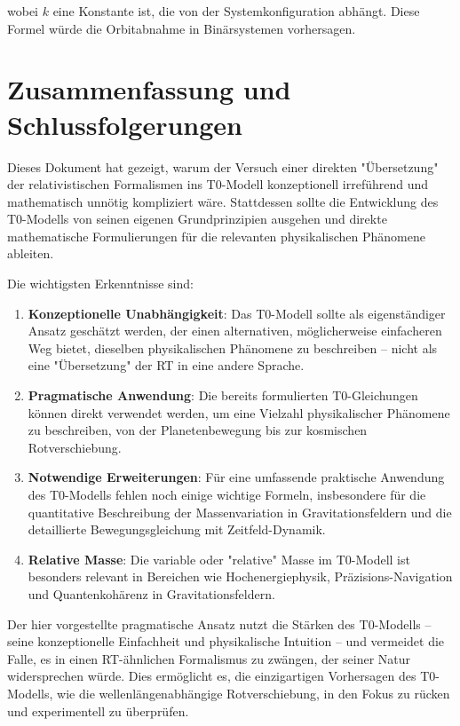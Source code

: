 \documentclass[12pt,a4paper]{article}
\begin{document}
	wobei $k$ eine Konstante ist, die von der Systemkonfiguration abhängt. Diese Formel würde die Orbitabnahme in Binärsystemen vorhersagen.
	
	\section{Zusammenfassung und Schlussfolgerungen}
	\label{sec:conclusion}
	
	Dieses Dokument hat gezeigt, warum der Versuch einer direkten "Übersetzung" der relativistischen Formalismen ins T0-Modell konzeptionell irreführend und mathematisch unnötig kompliziert wäre. Stattdessen sollte die Entwicklung des T0-Modells von seinen eigenen Grundprinzipien ausgehen und direkte mathematische Formulierungen für die relevanten physikalischen Phänomene ableiten.
	
	Die wichtigsten Erkenntnisse sind:
	
	\begin{enumerate}
		\item \textbf{Konzeptionelle Unabhängigkeit}: Das T0-Modell sollte als eigenständiger Ansatz geschätzt werden, der einen alternativen, möglicherweise einfacheren Weg bietet, dieselben physikalischen Phänomene zu beschreiben – nicht als eine "Übersetzung" der RT in eine andere Sprache.
		
		\item \textbf{Pragmatische Anwendung}: Die bereits formulierten T0-Gleichungen können direkt verwendet werden, um eine Vielzahl physikalischer Phänomene zu beschreiben, von der Planetenbewegung bis zur kosmischen Rotverschiebung.
		
		\item \textbf{Notwendige Erweiterungen}: Für eine umfassende praktische Anwendung des T0-Modells fehlen noch einige wichtige Formeln, insbesondere für die quantitative Beschreibung der Massenvariation in Gravitationsfeldern und die detaillierte Bewegungsgleichung mit Zeitfeld-Dynamik.
		
		\item \textbf{Relative Masse}: Die variable oder "relative" Masse im T0-Modell ist besonders relevant in Bereichen wie Hochenergiephysik, Präzisions-Navigation und Quantenkohärenz in Gravitationsfeldern.
	\end{enumerate}
	
	Der hier vorgestellte pragmatische Ansatz nutzt die Stärken des T0-Modells – seine konzeptionelle Einfachheit und physikalische Intuition – und vermeidet die Falle, es in einen RT-ähnlichen Formalismus zu zwängen, der seiner Natur widersprechen würde. Dies ermöglicht es, die einzigartigen Vorhersagen des T0-Modells, wie die wellenlängenabhängige Rotverschiebung, in den Fokus zu rücken und experimentell zu überprüfen.
	
\end{document}
